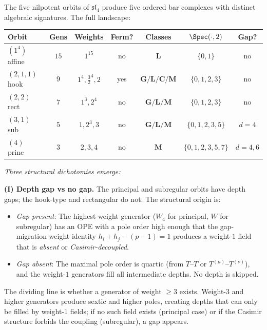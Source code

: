 \begin{remark}
\label{rem:sl4-landscape}

The five nilpotent orbits of $\mathfrak{sl}_4$ produce
five ordered bar complexes with distinct algebraic
signatures. The full landscape:

\begin{center}
\small
\renewcommand{\arraystretch}{1.15}
\begin{tabular}{lcccccc}
\textbf{Orbit} & \textbf{Gens}
 & \textbf{Weights} & \textbf{Ferm?}
 & \textbf{Classes} & \textbf{$\Spec(\cdot,2)$}
 & \textbf{Gap?} \\
\hline
$(1^4)$ affine & $15$ & $1^{15}$
 & no & $\mathbf{L}$ & $\{0,1\}$ & no \\
$(2,1,1)$ hook & $9$ & $1^4,\frac32^4,2$
 & yes & $\mathbf{G/L/C/M}$ & $\{0,1,2,3\}$
 & no \\
$(2,2)$ rect & $7$ & $1^3,2^4$
 & no & $\mathbf{G/L/M}$ & $\{0,1,2,3\}$
 & no \\
$(3,1)$ sub & $5$ & $1,2^3,3$
 & no & $\mathbf{G/L/M}$ & $\{0,1,2,3,5\}$
 & $d=4$ \\
$(4)$ princ & $3$ & $2,3,4$
 & no & $\mathbf{M}$ & $\{0,1,2,3,5,7\}$
 & $d=4,6$
\end{tabular}
\end{center}

\emph{Three structural dichotomies emerge:}

\medskip
\noindent\textbf{(I) Depth gap vs no gap.}
The principal and subregular orbits have depth gaps; the
hook-type and rectangular do not. The structural origin is:
\begin{itemize}
\item \emph{Gap present}: The highest-weight generator ($W_4$
 for principal, $W$ for subregular) has an OPE with a pole
 order high enough that the gap-migration weight identity
 $h_i + h_j - (p - 1) = 1$ produces a weight-$1$ field
 that is \emph{absent} or \emph{Casimir-decoupled}.
\item \emph{Gap absent}: The maximal pole order is quartic
 (from $T$--$T$ or $T^{(\mu)}$--$T^{(\nu)}$), and the
 weight-$1$ generators fill all intermediate depths. No
 depth is skipped.
\end{itemize}
The dividing line is whether a generator of weight $\ge 3$
exists. Weight-$3$ and higher generators produce sextic and
higher poles, creating depths that can only be filled by
weight-$1$ fields; if no such field exists (principal case)
or if the Casimir structure forbids the coupling
(subregular), a gap appears.


\end{remark}
